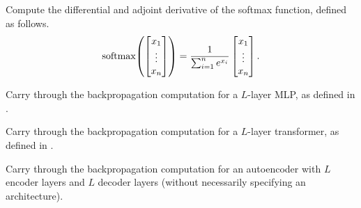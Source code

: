 \documentclass[../../book-main.tex]{subfiles}
\begin{document}
\begin{exercise}
    Compute the differential and adjoint derivative of the softmax function, defined as follows.
    \begin{equation}
        \softmax\rp{\mat{x_{1} \\ \vdots \\ x_{n}}} = \frac{1}{\sum_{i = 1}^{n}e^{x_{i}}}\mat{x_{1} \\ \vdots \\ x_{n}}.
    \end{equation}
\end{exercise}

\begin{exercise}
    Carry through the backpropagation computation for a \(L\)-layer MLP, as defined in .
\end{exercise}

\begin{exercise}
    Carry through the backpropagation computation for a \(L\)-layer transformer, as defined in .
\end{exercise}

\begin{exercise}
    Carry through the backpropagation computation for an autoencoder with \(L\) encoder layers and \(L\) decoder layers (without necessarily specifying an architecture).
\end{exercise}


\end{document}
